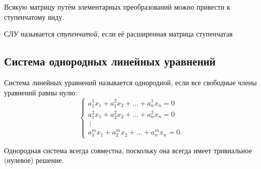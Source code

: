 \begin{theorem}
    Всякую матрицу путём элементарных преобразований можно привести к ступенчатому виду.
\end{theorem}
\begin{definition}
    СЛУ называется \textit{ступенчатой}, если её расширенная матрица ступенчатая
\end{definition}

\subsection*{Система однородных линейных уравнений}
\begin{definition}
    Система линейных уравнений называется однородной, если все свободные члены уравнений равны нулю:
    \begin{equation}
        \label{eq:SOLU}
        \begin{cases}
            a_1^1x_1 +  a_1^2x_2 + \ldots + a_n^1x_n = 0 \\
            a_1^2x_1 +  a_2^2x_2 + \ldots + a_n^2x_n = 0 \\
            ~\vdots \\
            a_1^mx_1 +  a_2^mx_2 + \dots + a_n^mx_n = 0.
        \end{cases}
        \end{equation}
\end{definition}
Однородная система всегда совместна, поскольку она всегда имеет тривиальное (нулевое) решение.

